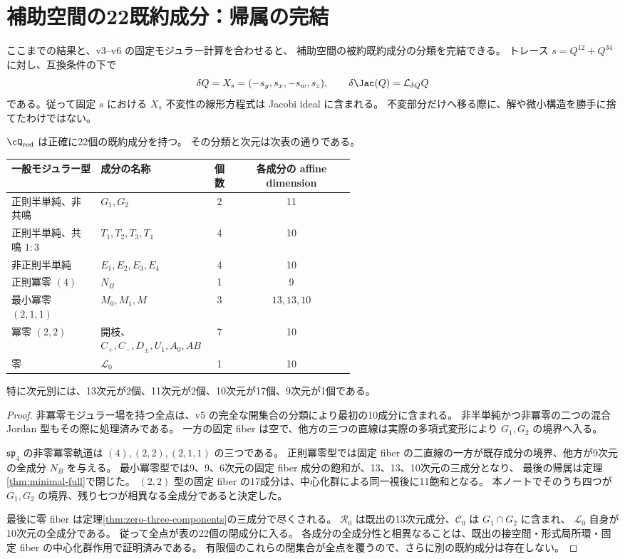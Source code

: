 \section{補助空間の22既約成分：帰属の完結}\label{sec:Q22}
ここまでの結果と、v3--v6 の固定モジュラー計算を合わせると、
補助空間の被約既約成分の分類を完結できる。
トレース $s=Q^{12}+Q^{34}$ に対し、互換条件の下で
\[
 \delta Q=X_s=(-s_y,s_x,-s_w,s_z),\qquad
 \delta\Jac(Q)=\mathcal L_{\delta Q}Q
\]
である。従って固定 $s$ における $X_s$ 不変性の線形方程式は Jacobi ideal に含まれる。
不変部分だけへ移る際に、解や微小構造を勝手に捨てたわけではない。

\begin{theorem}\label{thm:Q22}
$\cQ_{\mathrm{red}}$ は正確に22個の既約成分を持つ。
その分類と次元は次表の通りである。
\end{theorem}
\begin{center}\small
\begin{tabular}{p{0.26\linewidth}p{0.30\linewidth}cc}
\toprule
一般モジュラー型&成分の名称&個数&各成分の affine dimension\\\midrule
正則半単純、非共鳴&$G_1,G_2$&2&11\\
正則半単純、共鳴 $1:3$&$T_1,T_2,T_3,T_4$&4&10\\
非正則半単純&$E_1,E_2,E_3,E_4$&4&10\\
正則冪零 $(4)$&$N_B$&1&9\\
最小冪零 $(2,1,1)$&$M_0,M_1,M$&3&$13,13,10$\\
冪零 $(2,2)$&開枝、$C_+,C_-,D_\pm,U_1,A_0,AB$&7&10\\
零&$\mathcal L_0$&1&10\\\bottomrule
\end{tabular}
\end{center}
特に次元別には、13次元が2個、11次元が2個、10次元が17個、9次元が1個である。
\begin{proof}
非冪零モジュラー場を持つ全点は、v5 の完全な開集合の分類により最初の10成分に含まれる。
非半単純かつ非冪零の二つの混合 Jordan 型もその際に処理済みである。
一方の固定 fiber は空で、他方の三つの直線は実際の多項式変形により $G_1,G_2$ の境界へ入る。

$\mathfrak{sp}_4$ の非零冪零軌道は $(4),(2,2),(2,1,1)$ の三つである。
正則冪零型では固定 fiber の二直線の一方が既存成分の境界、他方が9次元の全成分 $N_B$ を与える。
最小冪零型では9、9、6次元の固定 fiber 成分の飽和が、13、13、10次元の三成分となり、
最後の帰属は定理\ref{thm:minimal-full}で閉じた。
$(2,2)$ 型の固定 fiber の17成分は、中心化群による同一視後に11飽和となる。
本ノートでそのうち四つが $G_1,G_2$ の境界、残り七つが相異なる全成分であると決定した。

最後に零 fiber は定理\ref{thm:zero-three-components}の三成分で尽くされる。
$\mathcal R_0$ は既出の13次元成分、$\mathcal C_0$ は $G_1\cap G_2$ に含まれ、
$\mathcal L_0$ 自身が10次元の全成分である。
従って全点が表の22個の閉成分に入る。
各成分の全成分性と相異なることは、既出の接空間・形式局所環・固定 fiber の中心化群作用で証明済みである。
有限個のこれらの閉集合が全点を覆うので、さらに別の既約成分は存在しない。
\end{proof}

